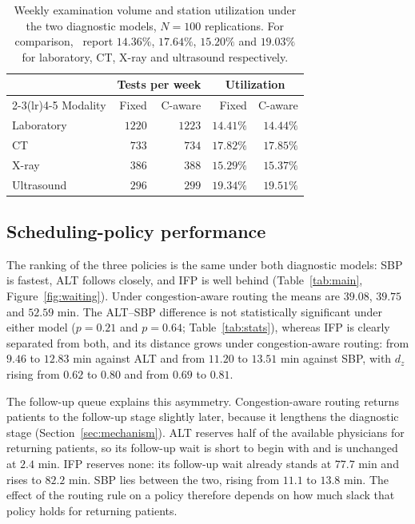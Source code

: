 \documentclass[sigconf]{acmart}
\begin{document}
\begin{table}[t]
\caption{Weekly examination volume and station utilization under the two
diagnostic models, $N=100$ replications. For comparison,~\cite{lv2026des}
report $14.36\%$, $17.64\%$, $15.20\%$ and $19.03\%$ for laboratory, CT, X-ray
and ultrasound respectively.}
\label{tab:devices}
\small
\setlength{\tabcolsep}{4pt}
\begin{tabular}{@{}lrrrr@{}}
\toprule
& \multicolumn{2}{c}{Tests per week} & \multicolumn{2}{c}{Utilization} \\
\cmidrule(lr){2-3}\cmidrule(lr){4-5}
Modality & Fixed & C-aware & Fixed & C-aware \\
\midrule
Laboratory & $1220$ & $1223$ & $14.41\%$ & $14.44\%$ \\
CT         & $733$  & $734$  & $17.82\%$ & $17.85\%$ \\
X-ray      & $386$  & $388$  & $15.29\%$ & $15.37\%$ \\
Ultrasound & $296$  & $299$  & $19.34\%$ & $19.51\%$ \\
\bottomrule
\end{tabular}
\end{table}

\subsection{Scheduling-policy performance}
\label{sec:ranking}

The ranking of the three policies is the same under both diagnostic models:
SBP is fastest, ALT follows closely, and IFP is well behind
(Table~\ref{tab:main}, Figure~\ref{fig:waiting}). Under congestion-aware
routing the means are $39.08$, $39.75$ and $52.59$ min. The ALT--SBP difference
is not statistically significant under either model ($p=0.21$ and $p=0.64$;
Table~\ref{tab:stats}), whereas IFP is clearly separated from both, and its
distance grows under congestion-aware routing: from $9.46$ to $12.83$ min
against ALT and from $11.20$ to $13.51$ min against SBP, with $d_z$ rising from
$0.62$ to $0.80$ and from $0.69$ to $0.81$.

The follow-up queue explains this asymmetry. Congestion-aware routing returns
patients to the follow-up stage slightly later, because it lengthens the
diagnostic stage (Section~\ref{sec:mechanism}). ALT reserves half of the
available physicians for returning patients, so its follow-up wait is short to
begin with and is unchanged at $2.4$ min. IFP reserves none: its follow-up wait
already stands at $77.7$ min and rises to $82.2$ min. SBP lies between the two,
rising from $11.1$ to $13.8$ min. The effect of the routing rule on a policy
therefore depends on how much slack that policy holds for returning patients.
\end{document}
